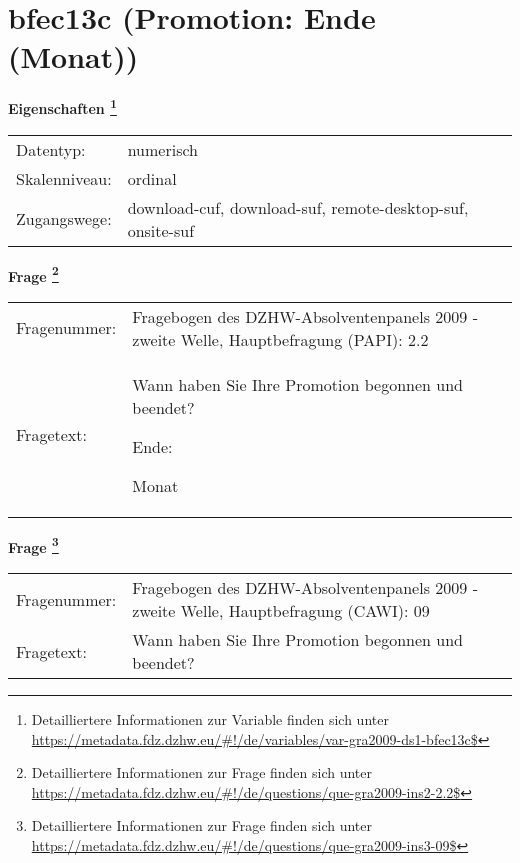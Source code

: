 
    \setcounter{footnote}{0}

    \vspace*{-1.8cm}
	\section{bfec13c (Promotion: Ende (Monat))}
	\label{section:bfec13c}



    \vspace*{0.5cm}
    \noindent\textbf{Eigenschaften
	\footnote{Detailliertere Informationen zur Variable finden sich unter
		\url{https://metadata.fdz.dzhw.eu/\#!/de/variables/var-gra2009-ds1-bfec13c$}}}\\
	\begin{tabularx}{\hsize}{@{}lX}
	Datentyp: & numerisch \\
	Skalenniveau: & ordinal \\
	Zugangswege: &
	  download-cuf, 
	  download-suf, 
	  remote-desktop-suf, 
	  onsite-suf
 \\
    \end{tabularx}



				\vspace*{0.5cm}
                \noindent\textbf{Frage
	                \footnote{Detailliertere Informationen zur Frage finden sich unter
		              \url{https://metadata.fdz.dzhw.eu/\#!/de/questions/que-gra2009-ins2-2.2$}}}\\
				\begin{tabularx}{\hsize}{@{}lX}
					Fragenummer: &
					  Fragebogen des DZHW-Absolventenpanels 2009 - zweite Welle, Hauptbefragung (PAPI):
					  2.2
 \\
					Fragetext: & Wann haben Sie Ihre Promotion begonnen und beendet?\par  Ende:\par  Monat \\
				\end{tabularx}
				\vspace*{0.5cm}
                \noindent\textbf{Frage
	                \footnote{Detailliertere Informationen zur Frage finden sich unter
		              \url{https://metadata.fdz.dzhw.eu/\#!/de/questions/que-gra2009-ins3-09$}}}\\
				\begin{tabularx}{\hsize}{@{}lX}
					Fragenummer: &
					  Fragebogen des DZHW-Absolventenpanels 2009 - zweite Welle, Hauptbefragung (CAWI):
					  09
 \\
					Fragetext: & Wann haben Sie Ihre Promotion begonnen und beendet? \\
				\end{tabularx}





